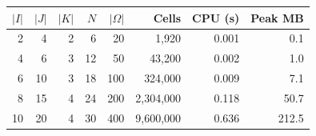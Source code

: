 \begin{tabular}{rrrrrrrr}
\toprule
$|I|$ & $|J|$ & $|K|$ & $N$ & $|\Omega|$ & Cells & CPU (s) & Peak MB \\
\midrule
2 & 4 & 2 & 6 & 20 & 1,920 & 0.001 & 0.1 \\
4 & 6 & 3 & 12 & 50 & 43,200 & 0.002 & 1.0 \\
6 & 10 & 3 & 18 & 100 & 324,000 & 0.009 & 7.1 \\
8 & 15 & 4 & 24 & 200 & 2,304,000 & 0.118 & 50.7 \\
10 & 20 & 4 & 30 & 400 & 9,600,000 & 0.636 & 212.5 \\
\bottomrule
\end{tabular}
